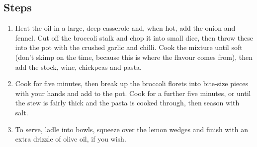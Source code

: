 \documentclass{book}
\begin{document}
\subsection*{Steps}
\begin{enumerate}
\item Heat the oil in a large, deep casserole and, when hot, add the onion and fennel. Cut off the broccoli stalk and chop it into small dice, then throw these into the pot with the crushed garlic and chilli. Cook the mixture until soft (don’t skimp on the time, because this is where the flavour comes from), then add the stock, wine, chickpeas and pasta.
\item Cook for five minutes, then break up the broccoli florets into bite-size pieces with your hands and add to the pot. Cook for a further five minutes, or until the stew is fairly thick and the pasta is cooked through, then season with salt.
\item To serve, ladle into bowls, squeeze over the lemon wedges and finish with an extra drizzle of olive oil, if you wish.
\end{enumerate}
\newpage
\end{document}
